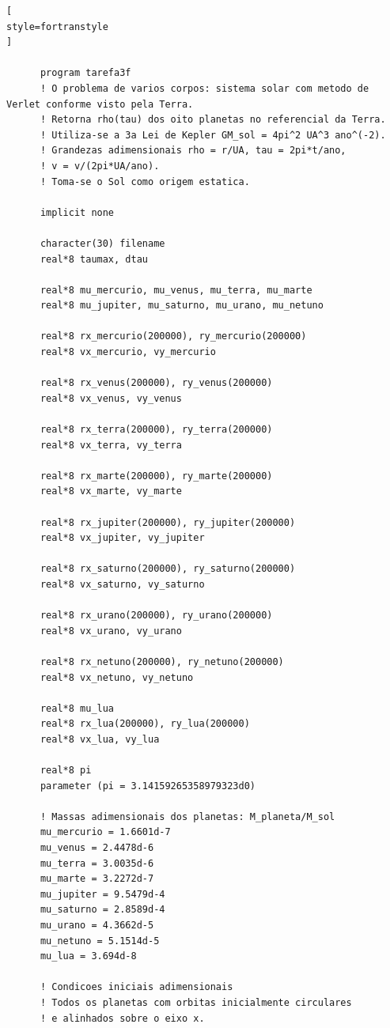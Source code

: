 \documentclass[12pt,a4paper]{article}
\begin{document}
\begin{lstlisting}[
style=fortranstyle
]

      program tarefa3f
      ! O problema de varios corpos: sistema solar com metodo de Verlet conforme visto pela Terra.
      ! Retorna rho(tau) dos oito planetas no referencial da Terra.
      ! Utiliza-se a 3a Lei de Kepler GM_sol = 4pi^2 UA^3 ano^(-2).
      ! Grandezas adimensionais rho = r/UA, tau = 2pi*t/ano,
      ! v = v/(2pi*UA/ano).
      ! Toma-se o Sol como origem estatica.

      implicit none

      character(30) filename
      real*8 taumax, dtau

      real*8 mu_mercurio, mu_venus, mu_terra, mu_marte
      real*8 mu_jupiter, mu_saturno, mu_urano, mu_netuno

      real*8 rx_mercurio(200000), ry_mercurio(200000)
      real*8 vx_mercurio, vy_mercurio

      real*8 rx_venus(200000), ry_venus(200000)
      real*8 vx_venus, vy_venus

      real*8 rx_terra(200000), ry_terra(200000)
      real*8 vx_terra, vy_terra

      real*8 rx_marte(200000), ry_marte(200000)
      real*8 vx_marte, vy_marte

      real*8 rx_jupiter(200000), ry_jupiter(200000)
      real*8 vx_jupiter, vy_jupiter

      real*8 rx_saturno(200000), ry_saturno(200000)
      real*8 vx_saturno, vy_saturno

      real*8 rx_urano(200000), ry_urano(200000)
      real*8 vx_urano, vy_urano

      real*8 rx_netuno(200000), ry_netuno(200000)
      real*8 vx_netuno, vy_netuno

      real*8 mu_lua
      real*8 rx_lua(200000), ry_lua(200000)
      real*8 vx_lua, vy_lua

      real*8 pi
      parameter (pi = 3.14159265358979323d0)

      ! Massas adimensionais dos planetas: M_planeta/M_sol
      mu_mercurio = 1.6601d-7
      mu_venus = 2.4478d-6
      mu_terra = 3.0035d-6
      mu_marte = 3.2272d-7
      mu_jupiter = 9.5479d-4
      mu_saturno = 2.8589d-4
      mu_urano = 4.3662d-5
      mu_netuno = 5.1514d-5
      mu_lua = 3.694d-8

      ! Condicoes iniciais adimensionais
      ! Todos os planetas com orbitas inicialmente circulares
      ! e alinhados sobre o eixo x.


\end{lstlisting}
\end{document}
